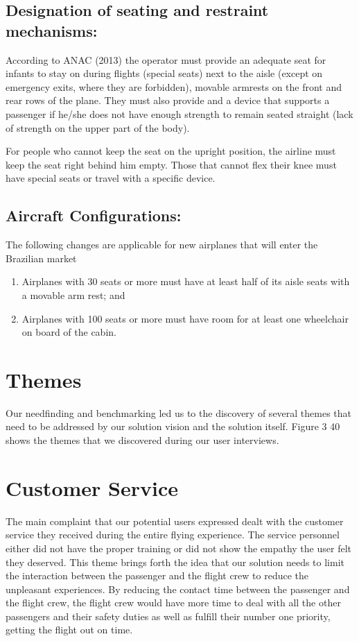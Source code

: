 \subsection{Designation of seating and restraint mechanisms:}
According to ANAC (2013) the operator must provide an adequate seat for infants to stay on during flights (special seats) next to the aisle (except on emergency exits, where they are forbidden), movable armrests on the front and rear rows of the plane. They must also provide and a device that supports a passenger if he/she does not have enough strength to remain seated straight (lack of strength on the upper part of the body).

For people who cannot keep the seat on the upright position, the airline must keep the seat right behind him empty. Those that cannot flex their knee must have special seats or travel with a specific device.

\subsection{Aircraft Configurations:}
The following changes are applicable for new airplanes that will enter the Brazilian market
\begin{enumerate}
  \item Airplanes with 30 seats or more must have at least half of its aisle seats with a movable arm rest; and 
  \item Airplanes with 100 seats or more must have room for at least one wheelchair on board of the cabin.
\end{enumerate}

\section{Themes}
Our needfinding and benchmarking led us to the discovery of several themes that need to be addressed by our solution vision and the solution itself.  Figure 3 40 shows the themes that we discovered during our user interviews.  

\section*{Customer Service}
The main complaint that our potential users expressed dealt with the customer service they received during the entire flying experience.  The service personnel either did not have the proper training or did not show the empathy the user felt they deserved.  This theme brings forth the idea that our solution needs to limit the interaction between the passenger and the flight crew to reduce the unpleasant experiences.  By reducing the contact time between the passenger and the flight crew, the flight crew would have more time to deal with all the other passengers and their safety duties as well as fulfill their number one priority, getting the flight out on time.

